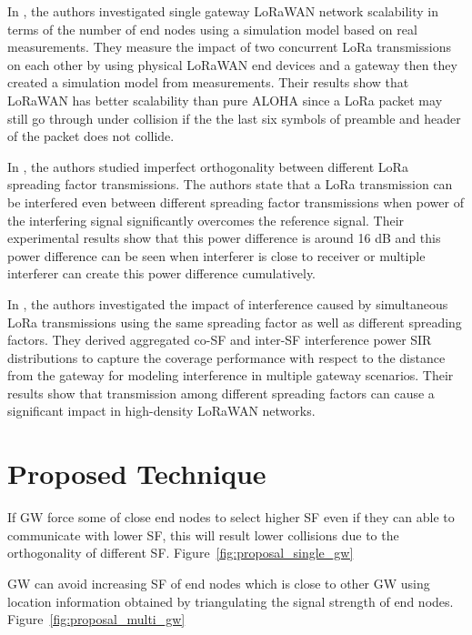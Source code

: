 \documentclass[conference]{IEEEtran}
\begin{document}
\par In \cite{s17061193}, the authors investigated single gateway LoRaWAN network scalability in terms of the number of end nodes using a simulation model based on real measurements. They measure the impact of two concurrent LoRa transmissions on each other by using physical LoRaWAN end devices and a gateway then they created a simulation model from measurements. Their results show that LoRaWAN has better scalability than pure ALOHA since a LoRa packet may still go through under collision if the the last six symbols of preamble and header of the packet does not collide.

\par In \cite{8267219}, the authors studied imperfect orthogonality between different LoRa spreading factor transmissions. The authors state that a LoRa transmission can be interfered even between different spreading factor transmissions when power of the interfering signal significantly overcomes the reference signal. Their experimental results show that this power difference is around 16 dB and this power difference can be seen when  interferer is close to receiver or multiple interferer can create this power difference cumulatively. 

\par In \cite{8430542}, the authors investigated the impact of interference caused by simultaneous LoRa transmissions using the same spreading factor as well as different spreading factors. They derived aggregated co-SF and inter-SF interference power SIR distributions to capture the coverage performance with respect to the distance from the gateway for modeling interference in multiple gateway scenarios. Their results show that transmission among different spreading factors can cause a significant impact in high-density LoRaWAN networks.


\section{Proposed Technique} \label{Proposed Technique}
\par If GW force some of close end nodes to select higher SF even if they can able to communicate with lower SF, this will result lower collisions due to the orthogonality of different SF. Figure~\ref{fig:proposal_single_gw}

\par GW can avoid increasing SF of end nodes which is close to other GW using location information obtained by triangulating the signal strength of end nodes. Figure~\ref{fig:proposal_multi_gw}
\end{document}
